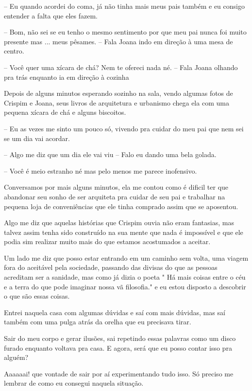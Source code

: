 -- Eu quando acordei do coma, já não tinha mais meus pais também e eu consigo entender a falta que eles fazem.

-- Bom, não sei se eu tenho o mesmo sentimento por que meu pai nunca foi muito presente mas ... meus pêsames. -- Fala Joana indo em direção à uma mesa de centro.

-- Você quer uma xícara de chá? Nem te ofereci nada né. -- Fala Joana olhando pra trás enquanto ia em direção à cozinha

Depois de alguns minutos esperando sozinho na sala, vendo algumas fotos de Crispim e Joana, seus livros de arquitetura e urbanismo chega ela com uma pequena xícara de chá e alguns biscoitos.

-- Eu as vezes me sinto um pouco só, vivendo pra cuidar do meu pai que nem sei se um dia vai acordar.

-- Algo me diz que um dia ele vai viu -- Falo eu dando uma bela golada.

-- Você é meio estranho né mas pelo menos me parece inofensivo.

Conversamos por mais alguns minutos, ela me contou como é dificil ter que abandonar seu sonho de ser arquiteta pra cuidar de seu pai e trabalhar na pequena loja de conveniências que ele tinha comprado assim que se aposentou.

Algo me diz que aquelas histórias que Crispim ouvia não eram fantasias, mas talvez assim tenha sido construído na sua mente que nada é impossível e que ele podia sim realizar muito mais do que estamos acostumados a aceitar.

Um lado me diz que posso estar entrando em um caminho sem volta, uma viagem fora do aceitável pela sociedade, passando das divisas do que as pessoas acreditam ser a sanidade, mas como já dizia o poeta " Há mais coisas entre o céu e a terra do que pode imaginar nossa vã filosofia." e eu estou disposto a descobrir o que são essas coisas.

Entrei naquela casa com algumas dúvidas e saí com mais dúvidas, mas saí também com uma pulga atrás da orelha que eu precisava tirar. 

Sair do meu corpo e gerar ilusões, sai repetindo essas palavras como um disco furado enquanto voltava pra casa. E agora, será que eu posso contar isso pra alguém?

Aaaaaai! que vontade de sair por aí experimentando tudo isso. Só preciso me lembrar de como eu consegui naquela situação.




